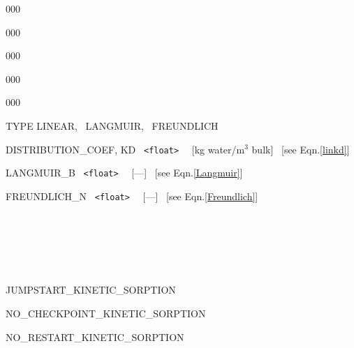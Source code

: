 \begin{deflist}{000}
\begin{deflist}{000}
\begin{deflist}{000}
\begin{deflist}{000}
\begin{deflist}{000}
\item [TYPE] LINEAR, \ LANGMUIR, \ FREUNDLICH
\item [DISTRIBUTION\_COEF, KD] \ {\tt <float>} \ \ [kg water/m$^3$ bulk] \ [see Eqn.\eqref{linkd}]
\item [LANGMUIR\_B] \ {\tt <float>} \ \ [---] \ [see Eqn.\eqref{Langmuir}]
\item [FREUNDLICH\_N] \ {\tt <float>} \ \ [---] \ [see Eqn.\eqref{Freundlich}]
\end{deflist}
\item [\keyend] ~

\end{deflist}

\item [\keyend] ~

~\\

\item[JUMPSTART\_KINETIC\_SORPTION]
\item[NO\_CHECKPOINT\_KINETIC\_SORPTION]
\item[NO\_RESTART\_KINETIC\_SORPTION]
\end{deflist}


\end{deflist}
\end{deflist}
